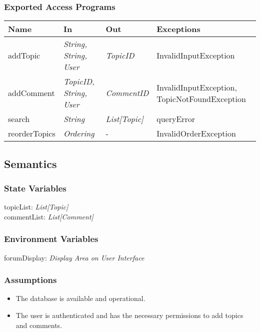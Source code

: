 \documentclass[12pt, titlepage]{article}
\begin{document}
\subsubsection{Exported Access Programs}
\begin{center}
\begin{tabular}{p{4cm} p{3cm} p{3cm} p{3cm}}
\hline
\textbf{Name} & \textbf{In} & \textbf{Out} & \textbf{Exceptions} \\
\hline
addTopic & \textit{String, String, User} & \textit{TopicID} & InvalidInputException \\
addComment & \textit{TopicID, String, User} & \textit{CommentID} & InvalidInputException, TopicNotFoundException \\
search & \textit{String} & \textit{List[Topic]} & queryError \\
reorderTopics & \textit{Ordering} & - & InvalidOrderException \\
\hline
\end{tabular}
\end{center}

\subsection{Semantics}

\subsubsection{State Variables}

topicList: \textit{List[Topic]}\\
commentList: \textit{List[Comment]}\\

\subsubsection{Environment Variables}

forumDisplay: \textit{Display Area on User Interface}

\subsubsection{Assumptions}

\begin{itemize}
  \item The database is available and operational.
  \item The user is authenticated and has the necessary permissions to add topics and comments.
\end{itemize}
\end{document}
